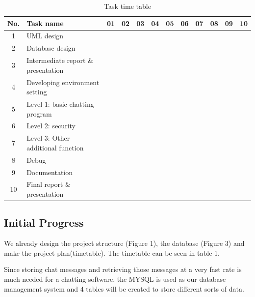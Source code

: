 \documentclass[a4paper]{article}
\begin{document}
\begin{table}[h]
\centering
\caption{Task time table}
\label{my-label}
\begin{tabular}{|c|l||c|c|c|c|c|c|c|c|c|c|}
\hline
\rowcolor{No}
No. & Task name & 01 & 02 & 03 & 04 & 05 & 06 & 07 & 08 & 09 & 10 \\ \hline \hline
1 & UML design & \cellcolor{UML} & \cellcolor{UML} &  &  &  &  &  &  &  &  \\ \hline
2 & Database design & \cellcolor{Data} & \cellcolor{Data} &  &  &  &  &  &  &  &  \\ \hline
3 & Intermediate report \& presentation &  & \cellcolor{intermediate} & \cellcolor{intermediate} &  &  &  &  &  &  &  \\ \hline
4 & Developing environment setting &  &  & \cellcolor{environ} & \cellcolor{environ} &  &  &  &  &  &  \\ \hline
5 & Level 1: basic chatting program &  &  & \cellcolor{level1} & \cellcolor{level1} & \cellcolor{level1} &  &  &  &  &  \\ \hline
6 & Level 2: security &  &  &  &  & \cellcolor{level2} & \cellcolor{level2} & \cellcolor{level2} &  &  &  \\ \hline
7 & Level 3: Other additional function &  &  &  &  &  &  & \cellcolor{level3} & \cellcolor{level3} & \cellcolor{level3} &  \\ \hline
8 & Debug &  &  &  &  & \cellcolor{debug} & \cellcolor{debug} & \cellcolor{debug} & \cellcolor{debug} & \cellcolor{debug} & \cellcolor{debug} \\ \hline
9 & Documentation &  &  &  &  & \cellcolor{documentation} &  & \cellcolor{documentation} &  & \cellcolor{documentation} &  \\ \hline
10 & Final report \& presentation &  &  &  &  &  &  &  &  & \cellcolor{final} & \cellcolor{final} \\ \hline
\end{tabular}
\end{table}


\subsection{Initial Progress}


We already design the project structure (Figure 1), the database (Figure 3) and make the project plan(timetable). The timetable can be seen in table 1. 

Since storing chat messages and retrieving those messages at a very fast rate is much needed for a chatting software, the MYSQL is used as our database management system and 4 tables will be created to store different sorts of data.
\end{document}
